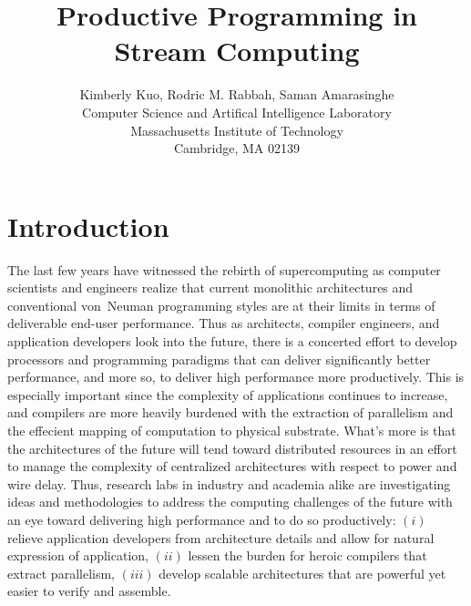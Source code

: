 \documentclass[11pt, letterpaper, onecolumn]{article}
\date{}
\title {\bf Productive Programming in Stream Computing}
\author{
  Kimberly Kuo, Rodric M. Rabbah, Saman Amarasinghe\\
  Computer Science and Artifical Intelligence Laboratory\\
  Massachusetts Institute of Technology\\
  Cambridge, MA 02139
}
\begin{document}
\maketitle

\singlespacing
\begin{abstract}
\end{abstract}

\doublespacing


\section{Introduction}

The last  few years  have witnessed the  rebirth of  supercomputing as
computer  scientists  and engineers  realize  that current  monolithic
architectures  and conventional von~Neuman  programming styles  are at
their  limits in terms  of deliverable  end-user performance.  Thus as
architects, compiler  engineers, and application  developers look into
the  future, there  is a  concerted effort  to develop  processors and
programming   paradigms   that   can  deliver   significantly   better
performance,   and  more   so,  to   deliver  high   performance  more
productively.  This is  especially important  since the  complexity of
applications  continues to  increase, and  compilers are  more heavily
burdened with the extraction  of parallelism and the effecient mapping
of  computation  to  physical  substrate.  What's  more  is  that  the
architectures of the future  will tend toward distributed resources in
an effort  to manage the complexity of  centralized architectures with
respect to power  and wire delay. Thus, research  labs in industry and
academia alike  are investigating  ideas and methodologies  to address
the computing challenges  of the future with an  eye toward delivering
high performance and to  do so productively: $(i)$ relieve application
developers from architecture details  and allow for natural expression
of  application, $(ii)$ lessen  the burden  for heroic  compilers that
extract parallelism,  $(iii)$ develop scalable  architectures that are
powerful yet easier to verify and assemble.
\end{document}
